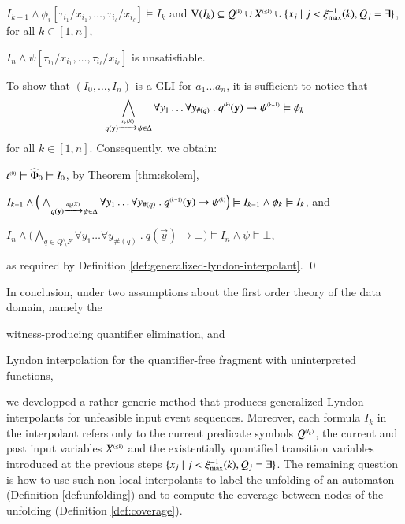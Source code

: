 {\begin{compactitem}
    \item $I_{k-1} \wedge \phi_i[\tau_{i_1}/x_{i_1}, \ldots,
      \tau_{i_\ell}/x_{i_\ell}] \models I_k$ and $\mathrm{V}({I_k}) \subseteq
      {Q}^{\scriptscriptstyle{({k})}} \cup {X}^{\scriptscriptstyle{({\leq k})}} \cup \{ x_j \mid j <
       \xi_{\max}^{-1}(k), Q_j = \exists \}$, for all $k \in [1,n]$,
    \item $I_n \wedge \psi[\tau_{i_1}/x_{i_1}, \ldots,
      \tau_{i_\ell}/x_{i_\ell}]$ is unsatisfiable.
  \end{compactitem}
  To show that $(I_0,\ldots,I_n)$ is a GLI for $a_1\ldots a_n$, it is
  sufficient to notice that \[\bigwedge_{q(\mathbf y) \xrightarrow{{\scriptscriptstyle a_k(X)}}_{{\scriptstyle }}
    \psi \in \Delta} \forall y_1 \ldots \forall y_{\#(q)} ~.~
  {q}^{\scriptscriptstyle{({k})}}(\mathbf y) \rightarrow {\psi}^{\scriptscriptstyle{({k+1})}} \models \phi_k\]
  for all $k \in [1,n]$. Consequently, we obtain: \begin{compactitem}
    \item ${\iota}^{\scriptscriptstyle{({0})}} \models \widehat{\Phi}_0 \models I_0$, by
      Theorem \ref{thm:skolem},
    \item $I_{k-1} \wedge \Big(\bigwedge_{q(\mathbf y) \xrightarrow{{\scriptscriptstyle a_k(X)}}_{{\scriptstyle }}
      \psi \in \Delta} \forall y_1 \ldots \forall y_{\#(q)} ~.~
      {q}^{\scriptscriptstyle{({k-1})}}(\mathbf y) \rightarrow {\psi}^{\scriptscriptstyle{({k})}}\Big) \models
      I_{k-1} \wedge \phi_k \models I_k$, and 
    \item $I_n \wedge \Big(\bigwedge_{q \in Q \setminus F} \forall y_1
      \ldots \forall y_{\#(q)} ~.~ q(\vec{y}) \rightarrow \bot\Big)
      \models I_n \wedge \psi \models \bot$,     
  \end{compactitem}
  as required by Definition
  \ref{def:generalized-lyndon-interpolant}. \qed}

In conclusion, under two assumptions about the first order theory of
the data domain, namely the\begin{inparaenum}[(i)]
\item witness-producing quantifier elimination, and
\item Lyndon interpolation for the quantifier-free fragment with
  uninterpreted functions,
\end{inparaenum}
we developped a rather generic method that produces generalized Lyndon
interpolants for unfeasible input event sequences. Moreover, each
formula $I_k$ in the interpolant refers only to the current predicate
symbols ${Q}^{\scriptscriptstyle{({I_k})}}$, the current and past input variables
${X}^{\scriptscriptstyle{({\leq k})}}$ and the existentially quantified transition
variables introduced at the previous steps $\{ x_j \mid j <
  \xi_{\max}^{-1}(k), Q_j = \exists \}$. The remaining question is how
to use such non-local interpolants to label the unfolding of an
automaton (Definition \ref{def:unfolding}) and to compute the coverage
between nodes of the unfolding (Definition \ref{def:coverage}).

